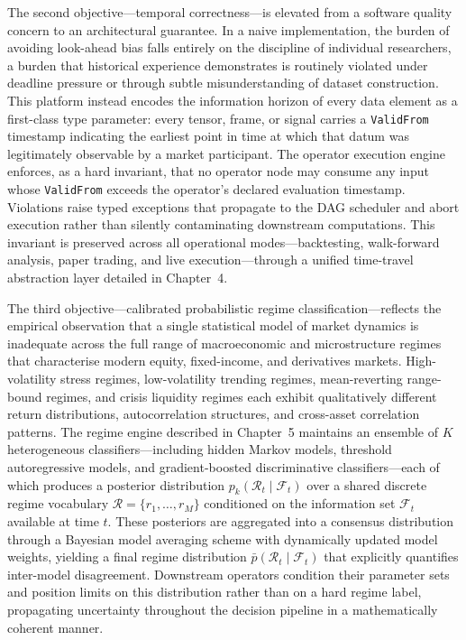 \documentclass[12pt,openany]{book}
\numberwithin{equation}{chapter}
\theoremstyle{plain}
\theoremstyle{definition}
\theoremstyle{remark}
\begin{document}
The second objective—temporal correctness—is elevated from a software quality concern to an architectural guarantee. In a naive implementation, the burden of avoiding look-ahead bias falls entirely on the discipline of individual researchers, a burden that historical experience demonstrates is routinely violated under deadline pressure or through subtle misunderstanding of dataset construction. This platform instead encodes the information horizon of every data element as a first-class type parameter: every tensor, frame, or signal carries a \texttt{ValidFrom} timestamp indicating the earliest point in time at which that datum was legitimately observable by a market participant. The operator execution engine enforces, as a hard invariant, that no operator node may consume any input whose \texttt{ValidFrom} exceeds the operator's declared evaluation timestamp. Violations raise typed exceptions that propagate to the DAG scheduler and abort execution rather than silently contaminating downstream computations. This invariant is preserved across all operational modes—backtesting, walk-forward analysis, paper trading, and live execution—through a unified time-travel abstraction layer detailed in Chapter~4.

The third objective—calibrated probabilistic regime classification—reflects the empirical observation that a single statistical model of market dynamics is inadequate across the full range of macroeconomic and microstructure regimes that characterise modern equity, fixed-income, and derivatives markets. High-volatility stress regimes, low-volatility trending regimes, mean-reverting range-bound regimes, and crisis liquidity regimes each exhibit qualitatively different return distributions, autocorrelation structures, and cross-asset correlation patterns. The regime engine described in Chapter~5 maintains an ensemble of $K$ heterogeneous classifiers—including hidden Markov models, threshold autoregressive models, and gradient-boosted discriminative classifiers—each of which produces a posterior distribution $p_k(\mathcal{R}_t \mid \mathcal{F}_t)$ over a shared discrete regime vocabulary $\mathcal{R} = \{r_1, \ldots, r_M\}$ conditioned on the information set $\mathcal{F}_t$ available at time $t$. These posteriors are aggregated into a consensus distribution through a Bayesian model averaging scheme with dynamically updated model weights, yielding a final regime distribution $\bar{p}(\mathcal{R}_t \mid \mathcal{F}_t)$ that explicitly quantifies inter-model disagreement. Downstream operators condition their parameter sets and position limits on this distribution rather than on a hard regime label, propagating uncertainty throughout the decision pipeline in a mathematically coherent manner.
\end{document}
